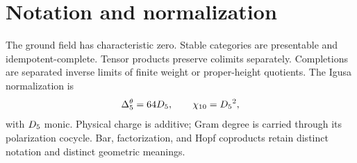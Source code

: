 \documentclass[11pt,twoside,openright]{memoir}
\begin{document}
\chapter*{Notation and normalization}
The ground field has characteristic zero.  Stable categories are presentable and idempotent-complete.  Tensor products preserve colimits separately.  Completions are separated inverse limits of finite weight or proper-height quotients.  The Igusa normalization is
\[
 {\Delta^{\theta}_5}=64{D_5},\qquad {\chi_{10}}={D_5}^2,
\]
with ${D_5}$ monic.  Physical charge is additive; Gram degree is carried through its polarization cocycle.  Bar, factorization, and Hopf coproducts retain distinct notation and distinct geometric meanings.

\tableofcontents
\mainmatter







\backmatter


\end{document}
